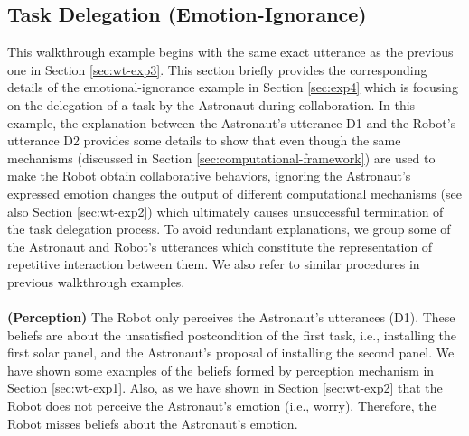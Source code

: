 \noindent{}

\subsection{Task Delegation (Emotion-Ignorance)}
\label{sec:wt-exp4}

This walkthrough example begins with the same exact utterance as the previous
one in Section \ref{sec:wt-exp3}. This section briefly provides the
corresponding details of the emotional-ignorance example in Section
\ref{sec:exp4} which is focusing on the delegation of a task by the Astronaut during
collaboration. In this example, the explanation between the Astronaut's
utterance D1 and the Robot's utterance D2 provides some details to show that
even though the same mechanisms (discussed in Section
\ref{sec:computational-framework}) are used to make the Robot obtain
collaborative behaviors, ignoring the Astronaut's expressed emotion changes the
output of different computational mechanisms (see also Section
\ref{sec:wt-exp2}) which ultimately causes unsuccessful termination of the task
delegation process. To avoid redundant explanations, we group some of the
Astronaut and Robot's utterances which constitute the representation of
repetitive interaction between them. We also refer to similar procedures in
previous walkthrough examples.\\

\noindent{}\\

\noindent\textbf{(Perception)} The Robot only perceives the Astronaut's
utterances (D1). These beliefs are about the unsatisfied postcondition of the
first task, i.e., installing the first solar panel, and the Astronaut's proposal
of installing the second panel. We have shown some examples of the beliefs
formed by perception mechanism in Section \ref{sec:wt-exp1}. Also, as we have
shown in Section \ref{sec:wt-exp2} that the Robot does not perceive the
Astronaut's emotion (i.e., worry). Therefore, the Robot misses beliefs about the
Astronaut's emotion.\\


